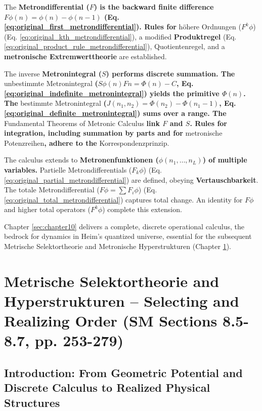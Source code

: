 \documentclass[
    12pt,              %
    a4paper,           %
    headings=normal,   %
    twoside=true,      %
    BCOR=8mm,          %
]{scrbook}
\newcommand{\metrondifferential}{F}
\newcommand{\metronintegral}{S}
\begin{document}
The \textbf{Metrondifferential (\(\metrondifferential\)) is the backward finite difference \(F\phi(n) = \phi(n) - \phi(n-1)\) (Eq. \eqref{eq:original_first_metrondifferential}). Rules for }höhere Ordnungen (\(F^k\phi\)) (Eq. \eqref{eq:original_kth_metrondifferential}), a modified \textbf{Produktregel} (Eq. \eqref{eq:original_product_rule_metrondifferential}), Quotientenregel, and a \textbf{metronische Extremwerttheorie} are established.

The inverse \textbf{Metronintegral (\(\metronintegral\)) performs discrete summation. The }unbestimmte Metronintegral\textbf{ (\(S\phi(n)Fn = \Phi(n) - C\), Eq. \eqref{eq:original_indefinite_metronintegral}) yields the primitive \(\Phi(n)\). The }bestimmte Metronintegral\textbf{ (\(J(n_1, n_2) = \Phi(n_2) - \Phi(n_1-1)\), Eq. \eqref{eq:original_definite_metronintegral}) sums over a range. The }Fundamental Theorems of Metronic Calculus\textbf{ link \(F\) and \(S\). Rules for integration, including summation by parts and for }metronische Potenzreihen\textbf{, adhere to the }Korrespondenzprinzip.

The calculus extends to \textbf{Metronenfunktionen (\(\phi(n_1, \dots, n_L)\)) of multiple variables. }Partielle Metrondifferentials (\(F_k\phi\)) (Eq. \eqref{eq:original_partial_metrondifferential}) are defined, obeying \textbf{Vertauschbarkeit}. The totale Metrondifferential (\(F\phi = \sum F_i\phi\)) (Eq. \eqref{eq:original_total_metrondifferential}) captures total change. An identity for \(F\phi\) and higher total operators (\(F^k\phi\)) complete this extension.

Chapter \ref{sec:chapter10} delivers a complete, discrete operational calculus, the bedrock for dynamics in Heim's quantized universe, essential for the subsequent Metrische Selektortheorie and Metronische Hyperstrukturen (Chapter \ref{sec:chapter11}).

\clearpage

\chapter{Metrische Selektortheorie and Hyperstrukturen – Selecting and Realizing Order (SM Sections 8.5-8.7, pp. 253-279)}
\label{sec:chapter11} %

\section{Introduction: From Geometric Potential and Discrete Calculus to Realized Physical Structures}
\label{sec:ch11_0_intro}
\end{document}
